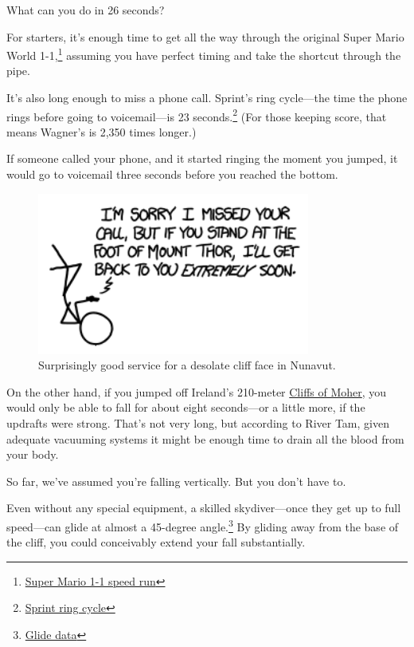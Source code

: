{{What can you do in 26 seconds?}

{For starters, it's enough time to get all the way through the original Super Mario World 1-1,{\footnote{ \href{http://www.youtube.com/watch?v=DGQGvAwqpbE}{Super Mario 1-1 speed run}} } assuming you have perfect timing and take the shortcut through the pipe.}

{It's also long enough to miss a phone call. Sprint's ring cycle—the time the phone rings before going to voicemail—is 23 seconds.{\footnote{ \href{http://www1.sprintpcs.com/support/HelpCenter.jsp?FOLDER\%3C\%3Efolder\_id=1531979\#4}{Sprint ring cycle}} } (For those keeping score, that means Wagner's is 2,350 times longer.)}

{If someone called your phone, and it started ringing the moment you jumped, it would go to voicemail three seconds before you reached the bottom.}

\begin{figure}[!htbp]
\centering
\includegraphics[scale=0.5, max width=0.8\textwidth]{imgs/a/51/freefall_voicemail.png}
\caption{Surprisingly good service for a desolate cliff face in Nunavut.}
\end{figure}

{On the other hand, if you jumped off Ireland's 210-meter \href{http://www.cliffsofmoher.ie/}{Cliffs of Moher}, you would only be able to fall for about eight seconds—or a little more, if the updrafts were strong. That's not very long, but according to River Tam, given adequate vacuuming systems it might be enough time to drain all the blood from your body.}

{So far, we've assumed you're falling vertically. But you don't have to.}

{Even without any special equipment, a skilled skydiver—once they get up to full speed—can glide at almost a 45-degree angle.{\footnote{ \href{http://www.dropzone.com/cgi-bin/forum/gforum.cgi?post=577711\#577711}{Glide data}} } By gliding away from the base of the cliff, you could conceivably extend your fall substantially.}

}
